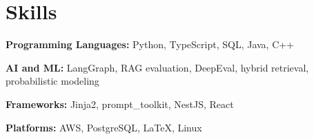 \section{Skills}

    \begin{onecolentry}
        \textbf{Programming Languages:} Python, TypeScript, SQL, Java, C++
    \end{onecolentry}

    \vspace{0.05 cm}

    \begin{onecolentry}
        \textbf{AI and ML:} LangGraph, RAG evaluation, DeepEval, hybrid retrieval, probabilistic modeling
    \end{onecolentry}

    \vspace{0.05 cm}

    \begin{onecolentry}
        \textbf{Frameworks:} Jinja2, prompt\_toolkit, NestJS, React
    \end{onecolentry}

    \vspace{0.05 cm}

    \begin{onecolentry}
        \textbf{Platforms:} AWS, PostgreSQL, LaTeX, Linux
    \end{onecolentry}

    \vspace{0.05 cm}

